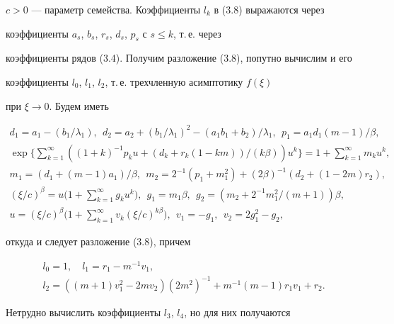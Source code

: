 $c>0$ --- параметр семейства. Коэффициенты $l_k$ в (3.8) выражаются через 


коэффициенты $a_s$, $b_s$, $r_s$, $d_s$, $p_s$ с $s\le k$, т.\,е. через 


коэффициенты рядов (3.4). Получим разложение (3.8), попутно вычислим и его 


коэффициенты $l_0$, $l_1$, $l_2$, т.\,е. трехчленную асимптотику $f(\xi)$ 


при $\xi\to0$. Будем иметь 


\begin{gather*} 


d_1=a_1-(b_1/\lambda_1),\ \ d_2=a_2+(b_1/\lambda_1)^2- 


(a_1b_1+b_2)/\lambda_1,\ \ p_1=a_1d_1(m-1)/\beta,\\ 


% 


\exp\bigg\{\sum^\infty_{k=1}((1+k)^{-1}p_k u+(d_k+r_k(1-km)) 


/(k\beta))u^k\bigg\}=1+\sum^\infty_{k=1}m_k u^k,\\ 


% 


m_1=(d_1+(m-1)a_1)/\beta,\ \ m_2=2^{-1}(p_1+m^2_1)+ 


(2\beta)^{-1}(d_2+(1-2m)r_2),\\ 


% 


(\xi/c)^\beta=u\bigg(1+\sum^\infty_{k=1}g_k u^k\bigg),\ \ 


g_1=m_1\beta,\ \ g_2=(m_2+2^{-1}m^2_1/(m+1))\beta,\\ 


% 


u=(\xi/c)^\beta\bigg(1+\sum^\infty_{k=1}v_k(\xi/c)^{k\beta} 


\bigg),\ \ v_1=-g_1,\ \ v_2=2g^2_1-g_2, 


\end{gather*} 


откуда и следует разложение (3.8), причем 


\begin{gather*} 


l_0=1,\quad l_1=r_1-m^{-1}v_1,\\ 


l_2=((m+1)v^2_1-2m v_2)(2m^2)^{-1}+m^{-1}(m-1)r_1v_1+r_2. 


\end{gather*} 


Нетрудно вычислить коэффициенты $l_3$, $l_4$, но для них получаются 


